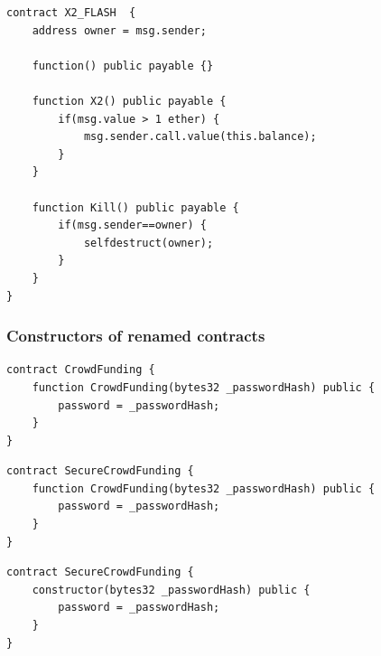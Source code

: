 \documentclass[xcolor=x11names,compress]{beamer}
\makeatletter
\def\beamer@writeslidentry@miniframesoff{%
  \expandafter\beamer@ifempty\expandafter{\beamer@framestartpage}{}%
  {
    \clearpage\beamer@notesactions%
  }
}
\newcommand*{\miniframesoff}{\let\beamer@writeslidentry=\beamer@writeslidentry@miniframesoff}
\makeatother
\begin{document}
\begin{frame}[fragile]
	\begin{verbatim}
contract X2_FLASH  {
    address owner = msg.sender;
    
    function() public payable {}
    
    function X2() public payable {
        if(msg.value > 1 ether) {
            msg.sender.call.value(this.balance);
        }
    }
    
    function Kill() public payable {
        if(msg.sender==owner) {
            selfdestruct(owner);
        }
    }
}
\end{verbatim}
\end{frame}

\miniframesoff
\begin{frame}
\end{frame}

\begin{frame}[fragile]
	\frametitle{Constructors of renamed contracts}
	\begin{overprint}
		\begin{minipage}[c][0.7\textheight][c]{\textwidth}
			\begin{verbatim}
contract CrowdFunding {
    function CrowdFunding(bytes32 _passwordHash) public {
        password = _passwordHash;
    }
}
\end{verbatim}
		\end{minipage}
		\begin{minipage}[c][0.7\textheight][c]{\textwidth}
			\begin{verbatim}
contract SecureCrowdFunding {
    function CrowdFunding(bytes32 _passwordHash) public {
        password = _passwordHash;
    }
}
    \end{verbatim}
		\end{minipage}
		\begin{minipage}[c][0.7\textheight][c]{\textwidth}
			\begin{verbatim}
contract SecureCrowdFunding {
    constructor(bytes32 _passwordHash) public {
        password = _passwordHash;
    }
}
    \end{verbatim}
		\end{minipage}
	\end{overprint}
\end{frame}
\end{document}
